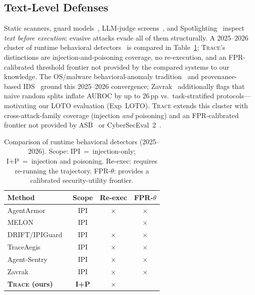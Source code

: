 \documentclass[conference]{IEEEtran}
\begin{document}
\subsection{Text-Level Defenses}

Static scanners, guard models~\cite{inan2023llama}, LLM-judge
screens~\cite{yi2023benchmarking}, and Spotlighting~\cite{hines2024spotlighting}
inspect \emph{text before execution}: evasive attacks evade all of them
structurally.  A 2025--2026 cluster of runtime behavioral
detectors~\cite{liu2025traceaegis,sequeira2026agentsentry,
yu2026frauddetection,zavrak2026contentaware} is compared in
Table~\ref{tab:comparison}; \textsc{Trace}'s distinctions are
injection-and-poisoning coverage, no re-execution, and an
FPR-calibrated threshold frontier not provided by the compared
systems to our knowledge.
The OS/malware behavioral-anomaly tradition~\cite{forrest1996sense,
sekar2001fast,rieck2011automatic,buczak2016survey} and provenance-based
IDS~\cite{zipperle2022pids,cheng2024kairos} ground this 2025--2026
convergence; Zavrak~\cite{zavrak2026contentaware} additionally flags
that naive random splits inflate AUROC by up to 26\,pp vs.\
task-stratified protocols---motivating our LOTO evaluation (Exp~LOTO).
\textsc{Trace} extends this cluster with cross-attack-family coverage
(injection \emph{and} poisoning) and an FPR-calibrated frontier not
provided by ASB~\cite{zhang2024agentsecuritybench} or
CyberSecEval~2~\cite{bhatt2024cyberseceval2}.

\begin{table}[t]
\centering\small
\caption{Comparison of runtime behavioral detectors (2025--2026).
  Scope: IPI~=~injection-only; I+P~=~injection and poisoning.
  Re-exec: requires re-running the trajectory.
  FPR-$\theta$: provides a calibrated security-utility frontier.}
\label{tab:comparison}
\begin{tabular}{lccc}
\toprule
Method & Scope & Re-exec & FPR-$\theta$ \\
\midrule
AgentArmor~\cite{wang2025agentarmor}              & IPI & $\times$ & $\times$ \\
MELON~\cite{zhu2025melon}                         & IPI & \checkmark & $\times$ \\
DRIFT/IPIGuard~\cite{li2025drift,an2025ipiguard}  & IPI & $\times$ & $\times$ \\
TraceAegis~\cite{liu2025traceaegis}               & IPI & $\times$ & $\times$ \\
Agent-Sentry~\cite{sequeira2026agentsentry}        & IPI & $\times$ & $\times$ \\
Zavrak~\cite{zavrak2026contentaware}              & IPI & $\times$ & $\times$ \\
\textbf{\textsc{Trace} (ours)}                    & \textbf{I+P} & $\times$ & \checkmark \\
\bottomrule
\end{tabular}
\end{table}
\end{document}

